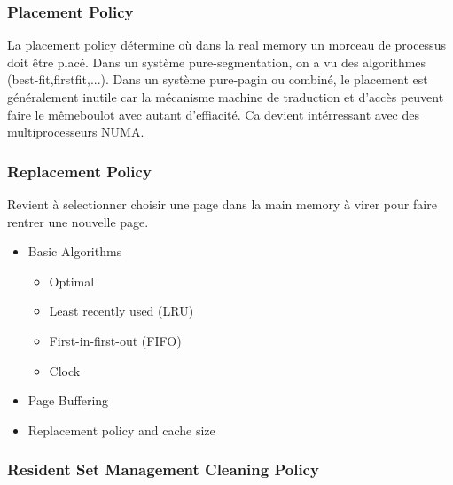 \subsubsection{Placement Policy}
La placement policy détermine où dans la real memory un morceau de processus doit être placé.
Dans un système pure-segmentation, on a vu des algorithmes (best-fit,firstfit,...).
Dans un système pure-pagin ou combiné, le placement est généralement inutile car la mécanisme machine de traduction et d'accès peuvent faire le mêmeboulot avec autant d'effiacité.
Ca devient intérressant avec des multiprocesseurs NUMA.

\subsubsection{Replacement Policy}
Revient à selectionner choisir une page dans la main memory à virer pour faire rentrer une nouvelle page.
\begin{itemize}
  \item Basic Algorithms
    \begin{itemize}
      \item Optimal
      \item Least recently used (LRU)
      \item First-in-first-out (FIFO)
      \item Clock
    \end{itemize}
  \item Page Buffering
  \item Replacement policy and cache size
\end{itemize}

\subsubsection{Resident Set Management Cleaning Policy}
